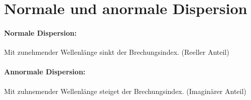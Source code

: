 
\section{Normale und anormale Dispersion}
\label{sec:dispersion}



\paragraph*{Normale Dispersion: }
Mit zunehmender Wellenlänge sinkt der Brechungsindex. (Reeller Anteil)

\paragraph*{Annormale Dispersion: }
Mit zuhnemender Wellenlänge steiget der Brechungsindex. (Imaginärer Anteil)